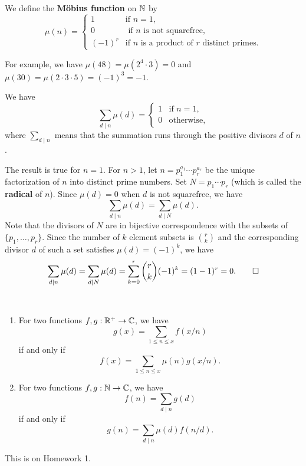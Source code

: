\begin{defn}
We define the {\bf M\"obius function} on $\mathbb{N}$ by 
\[ \mu(n) = \begin{cases} 1 & \text{if } n = 1, \\ 0 & \text{ if $n$ is not squarefree,} \\ 
(-1)^r & \text{if $n$ is a product of $r$ distinct primes.} \end{cases} \]
\end{defn}
For example, we have $\mu(48) = \mu(2^4 \cdot 3) = 0$ and $\mu(30) = \mu(2 \cdot 3 \cdot 5) = 
(-1)^3 = -1$. 

\begin{prop}
We have 
\[ \sum_{d \mid n} \mu(d) = \begin{cases} 1 & \text{if } n = 1, \\ 0 & \text{otherwise,} \end{cases} \]
where $\sum_{d\mid n}$ means that the summation runs through the positive divisors $d$ of $n$. 
\end{prop}
\begin{pf}
The result is true for $n = 1$. For $n > 1$, let $n = p_1^{a_1} \cdots p_r^{a_r}$ be the unique 
factorization of $n$ into distinct prime numbers. Set $N = p_1 \cdots p_r$ (which is called the 
{\bf radical} of $n$). Since $\mu(d) = 0$ when $d$ is not squarefree, we have 
\[ \sum_{d\mid n} \mu(d) = \sum_{d\mid N} \mu(d). \]
Note that the divisors of $N$ are in bijective correspondence with the subsets of $\{p_1, \dots, p_r\}$. 
Since the number of $k$ element subsets is $\binom{r}{k}$ and the corresponding divisor $d$ of such 
a set satisfies $\mu(d) = (-1)^k$, we have 
\[ \sum_{d \mid n} \mu(d) = \sum_{d \mid N} \mu(d) = \sum_{k=0}^r \binom rk (-1)^k = (1-1)^r = 0. \qedhere \]
\end{pf}

\begin{prop}~
\begin{enumerate}[(1)]
    \item For two functions $f, g : \mathbb{R}^+ \to \mathbb{C}$, we have 
    \[ g(x) = \sum_{1 \leq n \leq x} f(x/n) \]
    if and only if 
    \[ f(x) = \sum_{1 \leq n \leq x} \mu(n) g(x/n). \]
    \item For two functions $f, g : \mathbb{N} \to \mathbb{C}$, we have 
    \[ f(n) = \sum_{d \mid n} g(d) \]
    if and only if 
    \[ g(n) = \sum_{d \mid n} \mu(d) f(n/d). \]
\end{enumerate}
\end{prop}
\begin{pf}
This is on Homework 1.
\end{pf}

